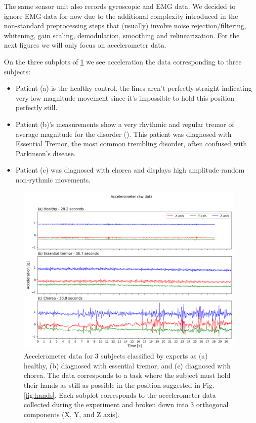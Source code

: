 The same sensor unit also records gyroscopic and EMG data. We decided to ignore EMG data for now due to the additional complexity introduced in the non-standard preprocessing steps that (usually) involve noise rejection/filtering, whitening, gain scaling, demodulation, smoothing and relinearization. For the next figures we will only focus on accelerometer data.


On the three subplots of \cref{fig:acc} we see acceleration the data corresponding to three subjects: 
\begin{itemize}
    \item Patient (a) is the healthy control, the lines aren't perfectly straight indicating very low magnitude movement since it's impossible to hold this position perfectly still.
    \item Patient (b)'s measurements show a very rhythmic and regular tremor of average magnitude for the disorder (). This patient was diagnosed with Essential Tremor, the most common trembling disorder, often confused with Parkinson's disease.
    \item Patient (c) was diagnosed with chorea and displays high amplitude random non-rythmic movements. 
\end{itemize}
 

\begin{figure}[ht]
\centering
\includegraphics[width=\linewidth]{figures/nemo/acc2.png}
\caption{Accelerometer data for 3 subjects classified by experts as (a) healthy, (b) diagnosed with essential tremor, and (c) diagnosed with chorea. The data corresponds to a task where the subject must hold their hands as still as possible in the position suggested in Fig. \ref{fig:hands}.
Each subplot corresponds to the accelerometer data collected during the experiment and broken down into 3 orthogonal components (X, Y, and Z axis). }
\label{fig:acc}
\end{figure}


